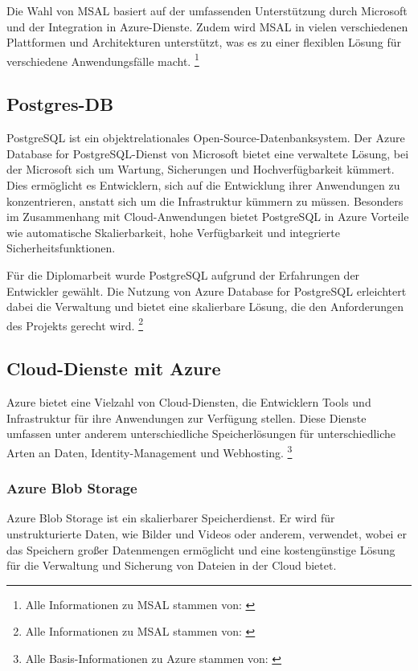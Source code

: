 Die Wahl von MSAL basiert auf der umfassenden Unterstützung durch Microsoft und der 
Integration in Azure-Dienste. Zudem wird MSAL in vielen verschiedenen Plattformen und 
Architekturen unterstützt, was es zu einer flexiblen Lösung für verschiedene Anwendungsfälle 
macht.
\footnote{Alle Informationen zu MSAL stammen von: \cite{MicrosoftCorporationr}}

\subsection{Postgres-DB}
\label{subsection:postgres_db}

PostgreSQL ist ein objektrelationales Open-Source-Datenbanksystem. Der Azure Database for 
PostgreSQL-Dienst von Microsoft bietet eine verwaltete Lösung, bei der Microsoft sich 
um Wartung, Sicherungen und Hochverfügbarkeit kümmert. Dies ermöglicht es Entwicklern, 
sich auf die Entwicklung ihrer Anwendungen zu konzentrieren, anstatt sich um die 
Infrastruktur kümmern zu müssen. Besonders im Zusammenhang mit Cloud-Anwendungen 
bietet PostgreSQL in Azure Vorteile wie automatische Skalierbarkeit, hohe Verfügbarkeit 
und integrierte Sicherheitsfunktionen.

Für die Diplomarbeit wurde PostgreSQL aufgrund der Erfahrungen der Entwickler gewählt. 
Die Nutzung von Azure Database for PostgreSQL erleichtert dabei die Verwaltung und 
bietet eine skalierbare Lösung, die den Anforderungen des Projekts gerecht wird.
\footnote{Alle Informationen zu MSAL stammen von: \cite{MicrosoftCorporations}}

\subsection{Cloud-Dienste mit Azure}

Azure bietet eine Vielzahl von Cloud-Diensten, die Entwicklern Tools und Infrastruktur 
für ihre Anwendungen zur Verfügung stellen. Diese Dienste umfassen 
unter anderem unterschiedliche Speicherlösungen für unterschiedliche Arten an Daten, 
Identity-Management und Webhosting.
\footnote{Alle Basis-Informationen zu Azure stammen von: \cite{MicrosoftCorporationt}}

\subsubsection{Azure Blob Storage}
\label{subsection:azure_blob_storage}

Azure Blob Storage ist ein skalierbarer Speicherdienst. Er wird für unstrukturierte Daten, 
wie Bilder und Videos oder anderem, verwendet, wobei er das Speichern großer Datenmengen 
ermöglicht und eine kostengünstige Lösung für die Verwaltung und Sicherung von Dateien 
in der Cloud bietet. 

